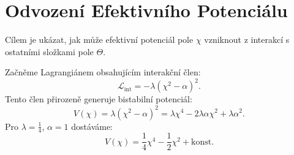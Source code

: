 \documentclass{article}
\begin{document}
\section*{Odvození Efektivního Potenciálu}

Cílem je ukázat, jak může efektivní potenciál pole $\chi$ vzniknout z interakcí s ostatními složkami pole $\Theta$.

Začněme Lagrangiánem obsahujícím interakční člen:
\[
\mathcal{L}_{\text{int}} = -\lambda (\chi^2 - \alpha)^2.
\]
Tento člen přirozeně generuje bistabilní potenciál:
\[
V(\chi) = \lambda (\chi^2 - \alpha)^2 = \lambda \chi^4 - 2\lambda \alpha \chi^2 + \lambda \alpha^2.
\]
Pro $\lambda = \frac{1}{4}$, $\alpha = 1$ dostáváme:
\[
V(\chi) = \frac{1}{4} \chi^4 - \frac{1}{2} \chi^2 + \text{konst.}
\]
\end{document}
